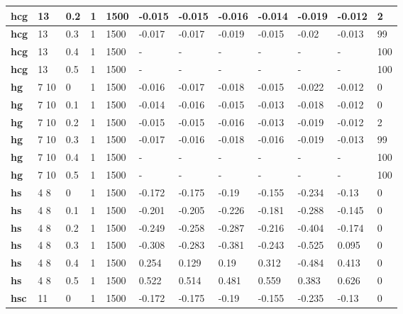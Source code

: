 \begin{longtable}[h]{|p{0.8cm}|p{1.5cm}|p{1cm}|p{1cm}|p{1cm}|p{1cm}|p{1cm}|p{1cm}|p{1cm}|p{1cm}|p{1cm}|p{1.5cm}|}
    \\ \hline
  \textbf{hcg } &  13         & 0.2 & 1 & 1500 & -0.015 & -0.015 & -0.016 & -0.014 & -0.019 & -0.012 &   2
    \\ \hline
  \textbf{hcg } &  13         & 0.3 & 1 & 1500 & -0.017 & -0.017 & -0.019 & -0.015 &  -0.02 & -0.013 &  99
    \\ \hline
  \textbf{hcg } &  13         & 0.4 & 1 & 1500 & - & - & - & - & - & - & 100
    \\ \hline
  \textbf{hcg } &  13         & 0.5 & 1 & 1500 & - & - & - & - & - & - & 100
    \\ \hline
  \textbf{hg  } &  7 10       &   0 & 1 & 1500 & -0.016 & -0.017 & -0.018 & -0.015 & -0.022 & -0.012 &   0
    \\ \hline
  \textbf{hg  } &  7 10       & 0.1 & 1 & 1500 & -0.014 & -0.016 & -0.015 & -0.013 & -0.018 & -0.012 &   0
    \\ \hline
  \textbf{hg  } &  7 10       & 0.2 & 1 & 1500 & -0.015 & -0.015 & -0.016 & -0.013 & -0.019 & -0.012 &   2
    \\ \hline
  \textbf{hg  } &  7 10       & 0.3 & 1 & 1500 & -0.017 & -0.016 & -0.018 & -0.016 & -0.019 & -0.013 &  99
    \\ \hline
  \textbf{hg  } &  7 10       & 0.4 & 1 & 1500 & - & - & - & - & - & - & 100
    \\ \hline
  \textbf{hg  } &  7 10       & 0.5 & 1 & 1500 & - & - & - & - & - & - & 100
    \\ \hline
  \textbf{hs  } &  4 8        &   0 & 1 & 1500 & -0.172 & -0.175 &  -0.19 & -0.155 & -0.234 &  -0.13 &   0
    \\ \hline
  \textbf{hs  } &  4 8        & 0.1 & 1 & 1500 & -0.201 & -0.205 & -0.226 & -0.181 & -0.288 & -0.145 &   0
    \\ \hline
  \textbf{hs  } &  4 8        & 0.2 & 1 & 1500 & -0.249 & -0.258 & -0.287 & -0.216 & -0.404 & -0.174 &   0
    \\ \hline
  \textbf{hs  } &  4 8        & 0.3 & 1 & 1500 & -0.308 & -0.283 & -0.381 & -0.243 & -0.525 &  0.095 &   0
    \\ \hline
  \textbf{hs  } &  4 8        & 0.4 & 1 & 1500 &  0.254 &  0.129 &   0.19 &  0.312 & -0.484 &  0.413 &   0
    \\ \hline
  \textbf{hs  } &  4 8        & 0.5 & 1 & 1500 &  0.522 &  0.514 &  0.481 &  0.559 &  0.383 &  0.626 &   0
    \\ \hline
  \textbf{hsc } &  11         &   0 & 1 & 1500 & -0.172 & -0.175 &  -0.19 & -0.155 & -0.235 &  -0.13 &   0

\end{longtable}
